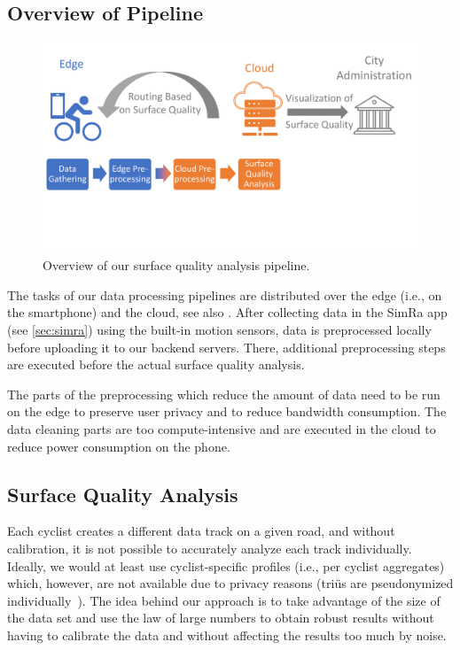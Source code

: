 \subsection{Overview of Pipeline}
\label{subsec:overview_of_pipeline}
\begin{figure}
    \centering
    \includegraphics[width=\columnwidth]{fig/overview.pdf}
    \caption{%
        Overview of our surface quality analysis pipeline.
    }%
    \label{fig:overview}
\end{figure}
The tasks of our data processing pipelines are distributed over the edge (i.e., on the smartphone) and the cloud, see also .
After collecting data in the SimRa app (see \ref{sec:simra}) using the built-in motion sensors, data is preprocessed locally before uploading it to our backend servers.
There, additional preprocessing steps are executed before the actual surface quality analysis.

The parts of the preprocessing which reduce the amount of data need to be run on the edge to preserve user privacy and to reduce bandwidth consumption.
The data cleaning parts are too compute-intensive and are executed in the cloud to reduce power consumption on the phone.

\subsection{Surface Quality Analysis}
\label{subsec:surface_quality_analysis}
Each cyclist creates a different data track on a given road, and without calibration, it is not possible to accurately analyze each track individually.
Ideally, we would at least use cyclist-specific profiles (i.e., per cyclist aggregates) which, however, are not available due to privacy reasons (triüs are pseudonymized individually~\cite{karakaya2020simra}).
The idea behind our approach is to take advantage of the size of the data set and use the law of large numbers to obtain robust results without having to calibrate the data and without affecting the results too much by noise.

